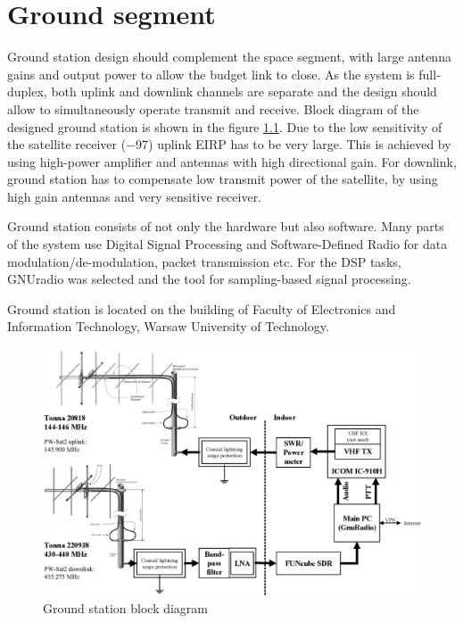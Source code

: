 \chapter{Ground segment}
Ground station design should complement the space segment, with large antenna gains and output power to allow the budget link to close. As the system is full-duplex, both uplink and downlink channels are separate and the design should allow to simultaneously operate transmit and receive. Block diagram of the designed ground station is shown in the figure \ref{gs_block_diagram}.
Due to the low sensitivity of the satellite receiver (\SI{-97}{\dBm}) uplink EIRP has to be very large. This is achieved by using high-power amplifier and antennas with high directional gain. For downlink, ground station has to compensate low transmit power of the satellite, by using high gain antennas and very sensitive receiver.

Ground station consists of not only the hardware but also software. Many parts of the system use Digital Signal Processing and Software-Defined Radio for data modulation/de-modulation, packet transmission etc. For the DSP tasks, GNUradio \cite{gnuradio} was selected and the tool for sampling-based signal processing.

Ground station is located on the building of Faculty of Electronics and Information Technology, Warsaw University of Technology.

\begin{figure}[H]
    \centering
    \includegraphics[width=0.7\paperwidth]{img/7/gs_block_diagram.eps}
    \caption{Ground station block diagram}
    \label{gs_block_diagram}
\end{figure}

